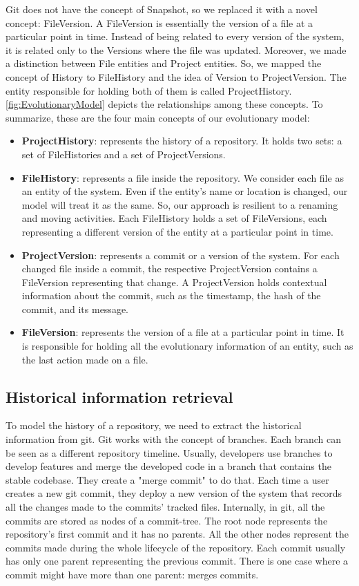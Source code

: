 Git does not have the concept of Snapshot, so we replaced it with a novel concept: FileVersion. 
A FileVersion is essentially the version of a file at a particular point in time. Instead of being related to every version of the system, it is related only to the Versions where the file was updated.
Moreover, we made a distinction between File entities and Project entities. So, we mapped the concept of History to FileHistory and the idea of Version to ProjectVersion. 
The entity responsible for holding both of them is called ProjectHistory. \autoref{fig:EvolutionaryModel} depicts the relationships among these concepts. 
To summarize, these are the four main concepts of our evolutionary model: 
\begin{itemize}
    \item \textbf{ProjectHistory}: represents the history of a repository. It holds two sets: a set of FileHistories and a set of ProjectVersions. 
    \item \textbf{FileHistory}: represents a file inside the repository. We consider each file as an entity of the system. Even if the entity's name or location is changed, our model will treat it as the same. So, our approach is resilient to a renaming and moving activities. Each FileHistory holds a set of FileVersions, each representing a different version of the entity at a particular point in time.  
    \item \textbf{ProjectVersion}: represents a commit or a version of the system. 
    For each changed file inside a commit, the respective ProjectVersion contains a FileVersion representing that change.
    A ProjectVersion holds contextual information about the commit, such as the timestamp, the hash of the commit, and its message.
    \item \textbf{FileVersion}: represents the version of a file at a particular point in time.
    It is responsible for holding all the evolutionary information of an entity, such as the last action made on a file. 
\end{itemize}

\subsection*{Historical information retrieval}
To model the history of a repository, we need to extract the historical information from git.
Git works with the concept of branches. Each branch can be seen as a different repository timeline.
Usually, developers use branches to develop features and merge the developed code in a branch that contains the stable codebase.
They create a "merge commit" to do that. 
Each time a user creates a new git commit, they deploy a new version of the system that records all the changes made to the commits' tracked files. 
Internally, in git, all the commits are stored as nodes of a commit-tree. 
The root node represents the repository's first commit and it has no parents. 
All the other nodes represent the commits made during the whole lifecycle of the repository. 
Each commit usually has only one parent representing the previous commit.
There is one case where a commit might have more than one parent: merges commits.

